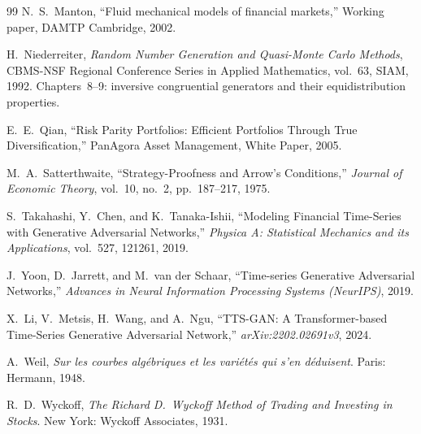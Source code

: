 \begin{thebibliography}{99}
N.~S.~Manton,
``Fluid mechanical models of financial markets,''
Working paper, DAMTP Cambridge, 2002.

H.~Niederreiter,
\emph{Random Number Generation and Quasi-Monte Carlo Methods},
CBMS-NSF Regional Conference Series in Applied Mathematics, vol.~63, SIAM, 1992.
Chapters~8--9: inversive congruential generators and their equidistribution properties.

E.~E.~Qian,
``Risk Parity Portfolios: Efficient Portfolios Through True Diversification,''
PanAgora Asset Management, White Paper, 2005.

M.~A.~Satterthwaite,
``Strategy-Proofness and Arrow's Conditions,''
\emph{Journal of Economic Theory}, vol.~10, no.~2, pp.~187--217, 1975.

S.~Takahashi, Y.~Chen, and K.~Tanaka-Ishii,
``Modeling Financial Time-Series with Generative Adversarial Networks,''
\emph{Physica A: Statistical Mechanics and its Applications}, vol.~527, 121261, 2019.

J.~Yoon, D.~Jarrett, and M.~van der Schaar,
``Time-series Generative Adversarial Networks,''
\emph{Advances in Neural Information Processing Systems (NeurIPS)}, 2019.

X.~Li, V.~Metsis, H.~Wang, and A.~Ngu,
``TTS-GAN: A Transformer-based Time-Series Generative Adversarial Network,''
\emph{arXiv:2202.02691v3}, 2024.

A.~Weil,
\emph{Sur les courbes alg\'ebriques et les vari\'et\'es qui s'en d\'eduisent}.
Paris: Hermann, 1948.


R.~D.~Wyckoff,
\emph{The Richard D.~Wyckoff Method of Trading and Investing in Stocks}.
New York: Wyckoff Associates, 1931.

\end{thebibliography}
